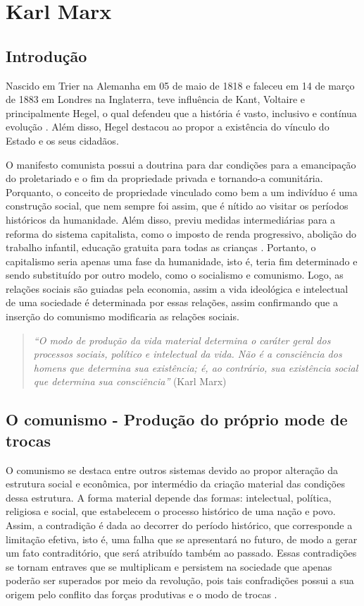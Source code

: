 \newpage
\section{Karl Marx}\label{marx}


\subsection{Introdução}

Nascido em Trier na Alemanha em 05 de maio de 1818 e faleceu em 14 de março de 1883 em Londres na Inglaterra, teve influência de Kant, Voltaire e principalmente Hegel, o qual defendeu que a história é vasto, inclusivo e contínua evolução \cite{marx90}.
Além disso, Hegel destacou ao propor a existência do vínculo do Estado e os seus cidadãos. 

O manifesto comunista possui a doutrina para dar condições para a emancipação do proletariado e o fim da propriedade privada e tornando-a comunitária.
Porquanto, o conceito de propriedade vinculado como bem a um indivíduo é uma construção social, que nem sempre foi assim, que é nítido ao visitar os períodos históricos da humanidade.
Além disso, previu medidas intermediárias para a reforma do sistema capitalista, como o imposto de renda progressivo, abolição do trabalho infantil, educação gratuita para todas as crianças \cite{marx90}.
Portanto, o capitalismo seria apenas uma fase da humanidade, isto é, teria fim determinado e sendo substituído por outro modelo, como o socialismo e comunismo.
Logo, as relações sociais são guiadas pela economia, assim a vida ideológica e intelectual de uma sociedade é determinada por essas relações, assim confirmando que a inserção do comunismo modificaria as relações sociais.

\begin{quotation}
    \textit{``O modo de produção da vida material determina o caráter geral dos processos sociais, político e intelectual da vida. 
    Não é a consciência dos homens que determina sua existência; é, ao contrário, sua existência social que determina sua consciência''} (Karl Marx)
\end{quotation}

\subsection{O comunismo  - Produção do próprio mode de trocas}

O comunismo se destaca entre outros sistemas devido ao propor alteração da estrutura social e econômica, por intermédio da criação material das condições dessa estrutura.
A forma material depende das formas: intelectual, política, religiosa e social, que estabelecem o processo histórico de uma nação e povo.
Assim, a contradição é dada ao decorrer do período histórico, que corresponde a limitação efetiva, isto é, uma falha que se apresentará no futuro, de modo a gerar um fato contraditório, que será atribuído também ao passado.
Essas contradições se tornam entraves que se multiplicam e persistem na sociedade que apenas poderão ser superados por meio da revolução, pois tais confradições possui a sua origem pelo conflito das forças produtivas e o modo de trocas \cite{marx_ideologia}.

